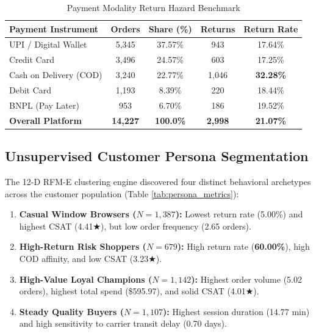 \documentclass[conference]{IEEEtran}
\begin{document}
\begin{table}[t]
\centering
\caption{Payment Modality Return Hazard Benchmark}
\label{tab:payment_metrics}
\begin{tabular}{lcccc}
\toprule
\textbf{Payment Instrument} & \textbf{Orders} & \textbf{Share (\%)} & \textbf{Returns} & \textbf{Return Rate} \\
\midrule
UPI / Digital Wallet & 5,345 & 37.57\% & 943 & 17.64\% \\
Credit Card & 3,496 & 24.57\% & 603 & 17.25\% \\
Cash on Delivery (COD) & 3,240 & 22.77\% & 1,046 & \textbf{32.28\%} \\
Debit Card & 1,193 & 8.39\% & 220 & 18.44\% \\
BNPL (Pay Later) & 953 & 6.70\% & 186 & 19.52\% \\
\midrule
\textbf{Overall Platform} & \textbf{14,227} & \textbf{100.0\%} & \textbf{2,998} & \textbf{21.07\%} \\
\bottomrule
\end{tabular}
\end{table}

\subsection{Unsupervised Customer Persona Segmentation}
The 12-D RFM-E clustering engine discovered four distinct behavioral archetypes across the customer population (Table \ref{tab:persona_metrics}):
\begin{enumerate}
    \item \textbf{Casual Window Browsers ($N=1,387$):} Lowest return rate (5.00\%) and highest CSAT (4.41★), but low order frequency (2.65 orders).
    \item \textbf{High-Return Risk Shoppers ($N=679$):} High return rate (\textbf{60.00\%}), high COD affinity, and low CSAT (3.23★).
    \item \textbf{High-Value Loyal Champions ($N=1,142$):} Highest order volume (5.02 orders), highest total spend (\$595.97), and solid CSAT (4.01★).
    \item \textbf{Steady Quality Buyers ($N=1,107$):} Highest session duration (14.77 min) and high sensitivity to carrier transit delay (0.70 days).
\end{enumerate}
\end{document}
